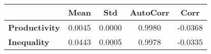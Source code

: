 \begin{tiny}\begin{tabular}{|l|c|c|c|c|}
\hline
&\textbf{Mean}&\textbf{Std}&\textbf{AutoCorr}&\textbf{Corr}\\\hline
\textbf{Productivity}&0.0045&0.0000&0.9980&-0.0368\\\hline
\textbf{Inequality}&0.0443&0.0005&0.9978&-0.0335\\\hline
\end{tabular}
\end{tiny}
